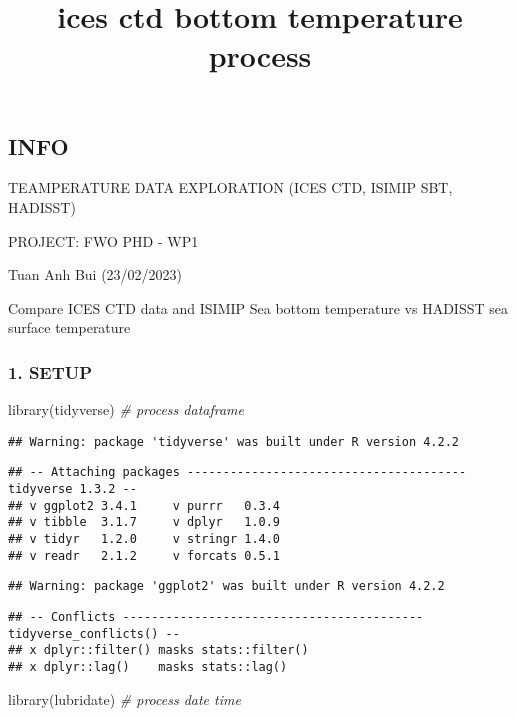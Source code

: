 \documentclass[
]{article}
\title{ices ctd bottom temperature process}
\author{}
\date{\vspace{-2.5em}}
\newenvironment{Shaded}{\begin{snugshade}}{\end{snugshade}}
\newcommand{\CommentTok}[1]{\textcolor[rgb]{0.56,0.35,0.01}{\textit{#1}}}
\newcommand{\FunctionTok}[1]{\textcolor[rgb]{0.00,0.00,0.00}{#1}}
\newcommand{\NormalTok}[1]{#1}
\begin{document}
\maketitle

\hypertarget{info}{%
\subsection{INFO}\label{info}}

TEAMPERATURE DATA EXPLORATION (ICES CTD, ISIMIP SBT, HADISST)

PROJECT: FWO PHD - WP1

Tuan Anh Bui (23/02/2023)

Compare ICES CTD data and ISIMIP Sea bottom temperature vs HADISST sea
surface temperature

\hypertarget{setup}{%
\subsubsection{1. SETUP}\label{setup}}

\begin{Shaded}
\begin{Highlighting}[]
\FunctionTok{library}\NormalTok{(tidyverse)  }\CommentTok{\# process dataframe}
\end{Highlighting}
\end{Shaded}

\begin{verbatim}
## Warning: package 'tidyverse' was built under R version 4.2.2
\end{verbatim}

\begin{verbatim}
## -- Attaching packages --------------------------------------- tidyverse 1.3.2 --
## v ggplot2 3.4.1     v purrr   0.3.4
## v tibble  3.1.7     v dplyr   1.0.9
## v tidyr   1.2.0     v stringr 1.4.0
## v readr   2.1.2     v forcats 0.5.1
\end{verbatim}

\begin{verbatim}
## Warning: package 'ggplot2' was built under R version 4.2.2
\end{verbatim}

\begin{verbatim}
## -- Conflicts ------------------------------------------ tidyverse_conflicts() --
## x dplyr::filter() masks stats::filter()
## x dplyr::lag()    masks stats::lag()
\end{verbatim}

\begin{Shaded}
\begin{Highlighting}[]
\FunctionTok{library}\NormalTok{(lubridate)  }\CommentTok{\# process date time }
\end{Highlighting}
\end{Shaded}
\end{document}
